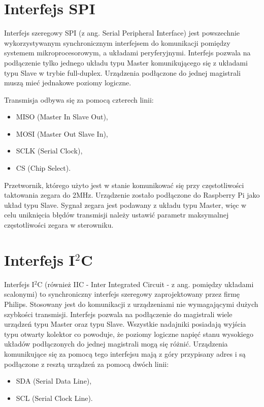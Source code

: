 \section{Interfejs SPI}

Interfejs szeregowy SPI (z ang. Serial Peripheral Interface)
jest powszechnie wykorzystywanym synchronicznym interfejsem do komunikacji pomiędzy systemem mikroprocesorowym, a układami peryferyjnymi. Interfejs pozwala na podłączenie tylko jednego układu typu Master komunikującego się z układami typu Slave w trybie full-duplex. Urządzenia podłączone do jednej magistrali muszą mieć jednakowe poziomy logiczne.


Transmisja odbywa się za pomocą czterech linii:
\begin{itemize}
\item MISO (Master In Slave Out), 
\item MOSI (Master Out Slave In),
\item SCLK (Serial Clock),
\item CS (Chip Select).
\end{itemize}

Przetwornik, którego użyto jest w stanie komunikować się przy częstotliwości taktowania zegara do 2MHz. Urządzenie zostało podłączone do Raspberry Pi jako układ typu Slave. Sygnał zegara jest podawany z układu typu Master, więc w celu uniknięcia błędów transmisji należy ustawić parametr maksymalnej częstotliwości zegara w sterowniku. 


\section{Interfejs I$^2$C}

Interfejs I$^2$C (również IIC - Inter Integrated Circuit - z ang. pomiędzy układami scalonymi) to synchroniczny interfejs szeregowy zaprojektowany przez firmę Philips. Stosowany jest do komunikacji z urządzeniami nie wymagającymi dużych szybkości transmisji. Interfejs pozwala na podłączenie do magistrali wiele urządzeń typu Master oraz typu Slave. Wszystkie nadajniki posiadają wyjścia typu otwarty kolektor co powoduje, że poziomy logiczne napięć stanu wysokiego układów podłączonych do jednej magistrali mogą się różnić. Urządzenia komunikujące się za pomocą tego interfejsu mają z góry przypisany adres i są podłączone z resztą urządzeń za pomocą dwóch linii: 
\begin{itemize}
\item SDA (Serial Data Line),
\item SCL (Serial Clock Line).
\end{itemize}

